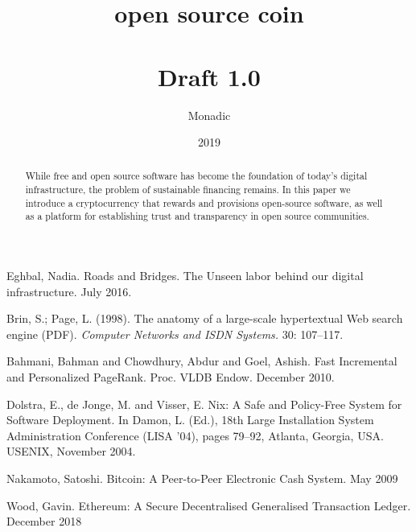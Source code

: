 \documentclass[a4paper, oneside, 10pt, draft]{amsart}
\begin{document}
\title[open source coin]{open source coin \\ \vspace{0.5em} \\ {\tiny Draft 1.0}}
\author{Monadic}
\date{2019}

\begin{abstract}
\small While free and open source software has become the foundation of today's
digital infrastructure, the problem of sustainable financing remains.  In this
paper we introduce a cryptocurrency that rewards and provisions open-source
software, as well as a platform for establishing trust and transparency in open
source communities.
\end{abstract}

\maketitle

\setlength{\columnsep}{1cm}
\begin{multicols}{2}

\medskip








\end{multicols}

\begin{thebibliography}{9}

 Eghbal, Nadia. Roads and Bridges. The Unseen labor
  behind our digital infrastructure. July 2016.

 Brin, S.; Page, L. (1998). The anatomy of a
  large-scale hypertextual Web search engine (PDF). \emph{Computer Networks
  and ISDN Systems.} 30: 107–117.

 Bahmani, Bahman and Chowdhury, Abdur and Goel,
  Ashish. Fast Incremental and Personalized PageRank. Proc. VLDB
  Endow. December 2010.

 Dolstra, E., de Jonge, M. and Visser, E. Nix: A Safe and
  Policy-Free System for Software Deployment. In Damon, L. (Ed.), 18th Large
  Installation System Administration Conference (LISA '04), pages 79–92, Atlanta,
  Georgia, USA. USENIX, November 2004.

 Nakamoto, Satoshi. Bitcoin: A Peer-to-Peer Electronic Cash
  System. May 2009

 Wood, Gavin. Ethereum: A Secure Decentralised Generalised
  Transaction Ledger. December 2018

\end{thebibliography}
\end{document}
